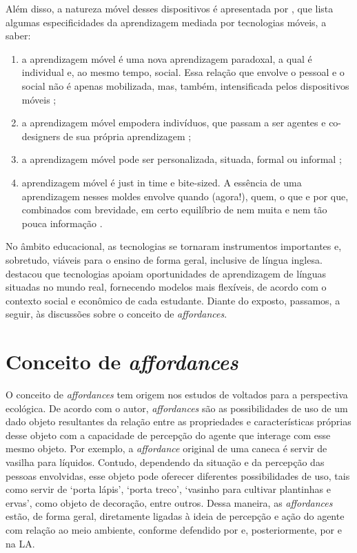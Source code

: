 \documentclass[portuguese]{textolivre}
\begin{document}
Além disso, a natureza móvel desses dispositivos é apresentada por \textcite{braga2017english}, que  lista algumas especificidades da aprendizagem mediada por tecnologias móveis, a saber:

\begin{enumerate}[label=\alph*)]
    \item a aprendizagem móvel é uma nova aprendizagem paradoxal, a qual é individual e, ao mesmo tempo, social. Essa relação que envolve o pessoal e o social não é apenas mobilizada, mas, também, intensificada pelos dispositivos móveis \cite{pegrum_mobile_2014, kukulska2005mobile, kukulska2013aligning}; 
    \item a aprendizagem móvel empodera indivíduos, que passam a ser agentes e co-designers de sua própria aprendizagem \cite{pegrum_mobile_2014};
    \item a aprendizagem móvel pode ser personalizada, situada, formal ou informal \cite{kukulska2013aligning};
    \item aprendizagem móvel é  just in time e bite-sized. A essência de uma aprendizagem nesses moldes envolve quando (agora!), quem, o que e por que, combinados com brevidade, em certo equilíbrio de nem muita e nem tão pouca informação \cite{pegrum_mobile_2014}.
\end{enumerate}

No âmbito educacional, as tecnologias se tornaram instrumentos importantes e, sobretudo, viáveis para o ensino de forma geral, inclusive de língua inglesa. \textcite{kukulska2015language} destacou que tecnologias apoiam oportunidades de aprendizagem de línguas situadas no mundo real, fornecendo modelos mais flexíveis, de acordo com o contexto social e econômico de cada estudante. Diante do exposto, passamos, a seguir, às discussões sobre o conceito de \emph{affordances}.


\section{Conceito de \emph{affordances}}
O conceito de \emph{affordances} tem origem nos estudos de \textcite{gibson1977theory} voltados para a perspectiva ecológica. De acordo com o autor, \emph{affordances} são as possibilidades de uso de um dado objeto resultantes da relação entre as propriedades e características próprias desse objeto com a capacidade de percepção do agente que interage com esse mesmo objeto. Por exemplo, a \emph{affordance} original de uma caneca é servir de vasilha para líquidos. Contudo, dependendo da situação e da percepção das pessoas envolvidas, esse objeto pode oferecer diferentes possibilidades de uso, tais como servir de ‘porta lápis', ‘porta treco’, ‘vasinho para cultivar plantinhas e ervas’, como objeto de decoração, entre outros. Dessa maneira, as \emph{affordances} estão, de forma geral, diretamente ligadas à ideia de percepção e ação do agente com relação ao meio ambiente, conforme defendido por \textcite{gibson1977theory} e, posteriormente, por \textcite{van_lier_ecology_2010} e \textcite{paiva2011} na LA.
\end{document}
